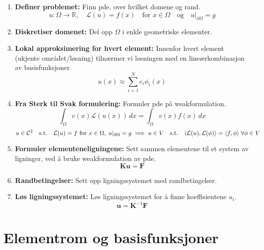 \begin{enumerate}
    \item \textbf{Definer problemet:} Finn pde, over hvilket domene og rand.
          \[
              u: \Omega \to \mathbb{R}, \quad \mathcal{L}(u) = f(x) \quad \text{for } x \in \Omega \quad \text{og} \quad u|_{\partial \Omega} = g
          \]
    \item \textbf{Diskretiser domenet:} Del opp \(\Omega\) i enkle geometriske elementer.
    \item \textbf{Lokal approksimering for hvert element:} Innenfor hvert element (ukjente området/løsning) tilnærmer vi løsningen med en lineærkombinasjon av basisfunksjoner.
          \[
              u(x) \approx \sum_{i=1}^N c_i \phi_i(x)
          \]
    \item \textbf{Fra Sterk til Svak formulering:} Formuler pde på weakformulation.
          \[
              \int_\Omega v(x) \mathcal{L}(u(x)) \, dx = \int_\Omega v(x) f(x) \, dx
          \]
          \[
              u \in \mathcal{C}^2 \quad \text{s.t.} \quad \mathcal{L}(u) = f \text{ for } x \in \Omega, \; u|_{\partial \Omega} = g
              \implies
              u \in V \quad \text{s.t.} \quad \inner*{\mathcal{L}(u), \mathcal{L}(\phi)} = \inner*{f, \phi} \; \forall \phi \in V
          \]
    \item \textbf{Formuler elementeneligningene:} Sett sammen elementene til et system av ligninger, ved å bruke weakformulation av pde.
          \[
              \symbf{K} \symbf{u} = \symbf{F}
          \]
    \item \textbf{Randbetingelser:} Sett opp ligningssystemet med randbetingelser.
    \item \textbf{Løs ligningssystemet:} Løs ligningssystemet for å finne koeffisientene \(u_i\).
          \[
              \symbf{u} = \symbf{K}^{-1} \symbf{F}
          \]
\end{enumerate}

\section{Elementrom og basisfunksjoner}

